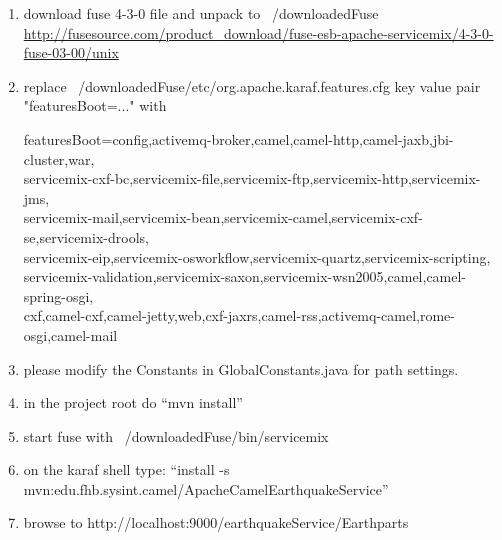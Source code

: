\documentclass[11pt,english,ngerman, headsepline]{scrreprt}
\begin{document}
\begin{enumerate}
  
\item  download fuse 4-3-0 file and unpack to ~/downloadedFuse
\url{http://fusesource.com/product_download/fuse-esb-apache-servicemix/4-3-0-fuse-03-00/unix}

\item  replace ~/downloadedFuse/etc/org.apache.karaf.features.cfg key value pair "featuresBoot=..." with

featuresBoot=config,activemq-broker,camel,camel-http,camel-jaxb,jbi-cluster,war,\\
servicemix-cxf-bc,servicemix-file,servicemix-ftp,servicemix-http,servicemix-jms,\\
servicemix-mail,servicemix-bean,servicemix-camel,servicemix-cxf-se,servicemix-drools,\\
servicemix-eip,servicemix-osworkflow,servicemix-quartz,servicemix-scripting,\\
servicemix-validation,servicemix-saxon,servicemix-wsn2005,camel,camel-spring-osgi,\\
cxf,camel-cxf,camel-jetty,web,cxf-jaxrs,camel-rss,activemq-camel,rome-osgi,camel-mail\\
  
  \item please modify the Constants in GlobalConstants.java for path settings.
  
\item  in the project root do ``mvn install''

\item start fuse with ~/downloadedFuse/bin/servicemix

\item  on the karaf shell type: ``install -s
mvn:edu.fhb.sysint.camel/ApacheCamelEarthquakeService''

\item browse to http://localhost:9000/earthquakeService/Earthparts

\end{enumerate}






 


\clearpage{}


\appendix
\renewcommand{\theequation}{A-\arabic{equation}}

\setcounter{equation}{0}  %




\listoffigures
\end{document}
